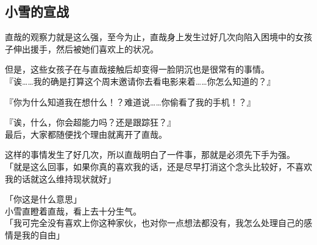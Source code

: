 \subsection{小雪的宣战}

直哉的观察力就是这么强，至今为止，直哉身上发生过好几次向陷入困境中的女孩子伸出援手，然后被她们喜欢上的状况。

但是，这些女孩子在与直哉接触后却变得一脸阴沉也是很常有的事情。\\

『诶……我的确是打算这个周末邀请你去看电影来着……你怎么知道的？』

『你为什么知道我在想什么！？难道说……你偷看了我的手机！？』

『诶，什么，你会超能力吗？还是跟踪狂？』\\

最后，大家都随便找个理由就离开了直哉。

这样的事情发生了好几次，所以直哉明白了一件事，那就是必须先下手为强。\\

「就是这么回事，如果你真的喜欢我的话，还是尽早打消这个念头比较好，不喜欢我的话就这么维持现状就好」

「你这是什么意思」\\

小雪直瞪着直哉，看上去十分生气。\\

「我可完全没有喜欢上你这种家伙，也对你一点想法都没有，我怎么处理自己的感情是我的自由」

